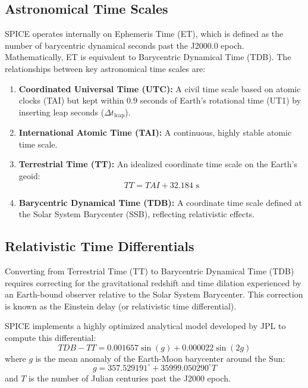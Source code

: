 \documentclass{acta}
\begin{document}
\subsection{Astronomical Time Scales}
SPICE operates internally on Ephemeris Time (ET), which is defined as the number of barycentric dynamical seconds past the J2000.0 epoch. Mathematically, ET is equivalent to Barycentric Dynamical Time (TDB). The relationships between key astronomical time scales are:
\begin{enumerate}
\item {\bf Coordinated Universal Time (UTC):} A civil time scale based on atomic clocks (TAI) but kept within $0.9$ seconds of Earth's rotational time (UT1) by inserting leap seconds ($\Delta t_{\text{leap}}$).
\item {\bf International Atomic Time (TAI):} A continuous, highly stable atomic time scale.
\item {\bf Terrestrial Time (TT):} An idealized coordinate time scale on the Earth's geoid:
\begin{equation}
TT = TAI + 32.184\text{ s}
\end{equation}
\item {\bf Barycentric Dynamical Time (TDB):} A coordinate time scale defined at the Solar System Barycenter (SSB), reflecting relativistic effects.
\end{enumerate}

\subsection{Relativistic Time Differentials}
Converting from Terrestrial Time (TT) to Barycentric Dynamical Time (TDB) requires correcting for the gravitational redshift and time dilation experienced by an Earth-bound observer relative to the Solar System Barycenter. This correction is known as the Einstein delay (or relativistic time differential).

SPICE implements a highly optimized analytical model developed by JPL to compute this differential:
\begin{equation}
TDB - TT = 0.001657 \sin(g) + 0.000022 \sin(2g)
\end{equation}
where $g$ is the mean anomaly of the Earth-Moon barycenter around the Sun:
\begin{equation}
g = 357.529191^\circ + 35999.050290^\circ T
\end{equation}
and $T$ is the number of Julian centuries past the J2000 epoch.
\end{document}
